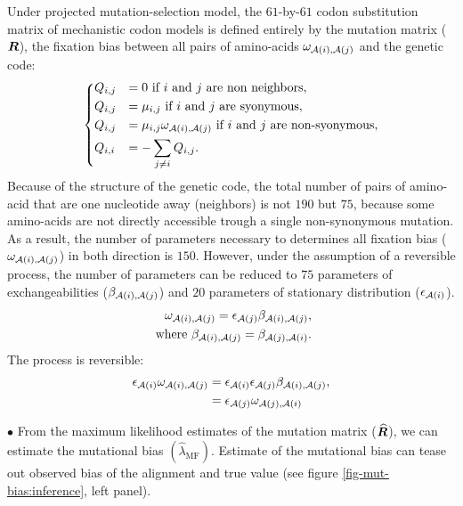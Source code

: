 Under projected mutation-selection model, the $61$-by-$61$ \gls{codon} \gls{substitution} matrix of mechanistic \gls{codon} models is defined entirely by the mutation matrix ($\bm{R}$), the fixation bias between all pairs of amino-acids $\omega_{\mathcal{A}({i}), \mathcal{A}({j})}$ and the genetic code:
\begin{equation}
    \begin{dcases}
        Q_{{i}, {j}} & = 0 \text{ if ${i}$ and ${j}$ are non neighbors}, \\
        Q_{{i}, {j}} & = \mu_{{i}, {j}} \text{ if ${i}$ and ${j}$ are syonymous}, \\
        Q_{{i}, {j}} & = \mu_{{i}, {j}} \omega_{\mathcal{A}({i}), \mathcal{A}({j})} \text{ if ${i}$ and ${j}$ are non-syonymous}, \\
        Q_{{i}, {i}} & = - \sum\limits_{{j} \neq {i}} Q_{{i}, {j}}.
    \end{dcases}
    \label{eq:codon-mean-field}
\end{equation}
Because of the structure of the genetic code, the total number of pairs of amino-acid that are one nucleotide away (neighbors) is not $190$ but $75$, because some amino-acids are not directly accessible trough a single non-synonymous mutation.
As a result, the number of parameters necessary to determines all fixation bias ($\omega_{\mathcal{A}({i}), \mathcal{A}({j})}$) in both direction is $150$.
However, under the assumption of a reversible process, the number of parameters can be reduced to $75$ parameters of exchangeabilities ($\beta_{\mathcal{A}({i}), \mathcal{A}({j})}$) and $20$ parameters of stationary distribution ($\epsilon_{\mathcal{A}({i})}$).
\begin{align}
    \omega_{\mathcal{A}({i}), \mathcal{A}({j})} = \epsilon_{\mathcal{A}({j})} \beta_{\mathcal{A}({i}), \mathcal{A}({j})}, \\
    \text{ where } \beta_{\mathcal{A}({i}), \mathcal{A}({j})} = \beta_{\mathcal{A}({j}), \mathcal{A}({i})}.
\end{align}
The process is reversible:
\begin{align}
    \epsilon_{\mathcal{A}({i})} \omega_{\mathcal{A}({i}), \mathcal{A}({j})} & = \epsilon_{\mathcal{A}({i})} \epsilon_{\mathcal{A}({j})} \beta_{\mathcal{A}({i}), \mathcal{A}({j})}, \\
    & = \epsilon_{\mathcal{A}({j})} \omega_{\mathcal{A}({j}), \mathcal{A}({i})}
\end{align}

$\bullet$ From the maximum \gls{likelihood} estimates of the mutation matrix ($\widehat{\bm{R}}$), we can estimate the mutational bias $\left({\widehat{\lambda}_{\text{MF}}} \right)$.
Estimate of the mutational bias can tease out observed bias of the alignment and true value (see figure \ref{fig-mut-bias:inference}, left panel).

